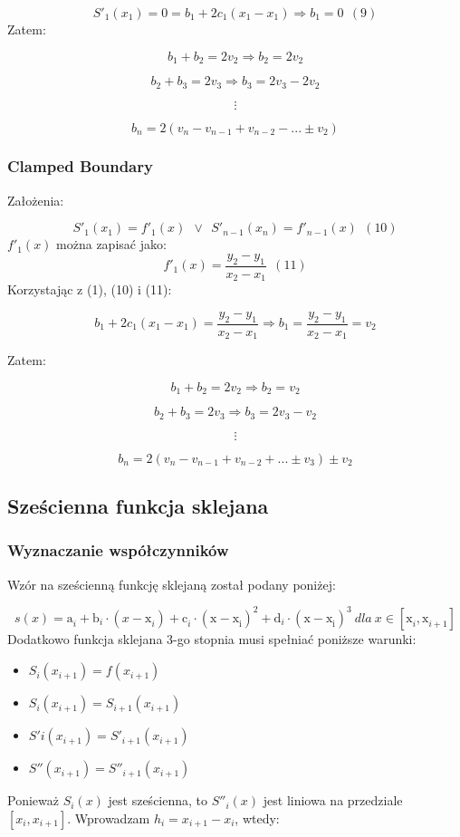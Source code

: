 \documentclass{article}
\begin{document}
\[S'_1(x_1) = 0 = b_1 + 2c_1(x_1-x_1) \Rightarrow b_1 = 0 \ \ (9)\]
\noindent
Zatem:

\[b_1+b_2 = 2v_2 \Rightarrow b_2 = 2v_2\]

\[b_2 + b_3 = 2v_3 \Rightarrow b_3 = 2v_3-2v_2\]

\[\vdots\]

\[b_n = 2(v_n-v_{n-1}+v_{n-2}-...\pm v_2)\]

\subsubsection{Clamped Boundary}
\noindent
Założenia:

\[S'_1(x_1) = f'_1(x) \ \ \vee \ \ S'_{n-1}(x_n) = f'_{n-1}(x) \ \ (10)\]
\noindent
\(f'_1(x)\) można zapisać jako:
\[f'_1(x) = \frac{y_2-y_1}{x_2-x_1} \ \ (11)\]
\noindent
Korzystając z (1), (10) i (11):

\[b_1 + 2c_1(x_1 - x_1) = \frac{y_2 - y_1}{x_2-x_1} \Rightarrow  b_1 = \frac{y_2 - y_1}{x_2-x_1} = v_2\]

\bigbreak
\noindent
Zatem:

\[b_1 + b_2 = 2v_2 \Rightarrow b_2 = v_2\]

\[b_2 + b_3 = 2v_3 \Rightarrow b_3 = 2v_3 - v_2 \]

\[\vdots \]

\[b_n = 2(v_n-v_{n-1}+v_{n-2}+...\pm v_3) \pm v_2\]

\subsection{Sześcienna funkcja sklejana}

\subsubsection{Wyznaczanie współczynników}

Wzór na sześcienną funkcję sklejaną został podany poniżej:

\[s(x) = \mathrm{a}_{i}^{} + \mathrm{b}_{i}^{}\cdot (x - \mathrm{x}_{i}^{}) +\mathrm{c}_{i}^{}\cdot \mathrm{(x - \mathrm{x}_{i}^{})}_{}^{2} + \mathrm{d}_{i}^{}\cdot  \mathrm{(x-\mathrm{x}_{i}^{})}_{}^{3} \ dla \ x \in [\mathrm{x}_{i}^{}, \mathrm{x}_{i + 1}^{}]\]
\noindent
Dodatkowo funkcja sklejana 3-go stopnia musi spełniać poniższe warunki:
\begin{itemize}
\item \(S_i(x_{i+1}) = f(x_{i+1})\)
\item \(S_i(x_{i+1}) = S_{i+1}(x_{i+1})\)
\item \(S'i(x_{i+1}) = S'_{i+1}(x_{i+1})\)
\item \(S''(x_{i+1}) = S''_{i+1}(x_{i+1})\)
\end{itemize}
\noindent
Ponieważ \(S_i(x)\) jest sześcienna, to \(S''_i(x)\) jest liniowa na przedziale \([x_i, x_{i+1}]\). Wprowadzam \(h_i = x_{i+1} - x_i\), wtedy:
\end{document}
